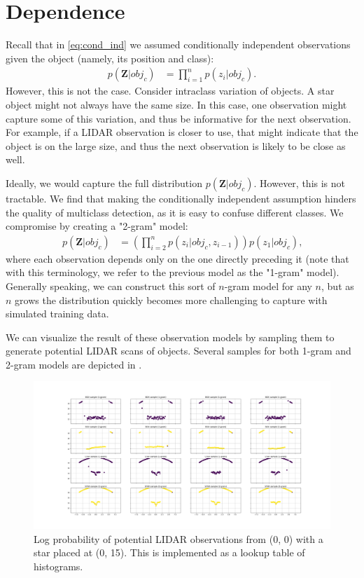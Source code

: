 \section{Dependence}

Recall that in \eqref{eq:cond_ind} we assumed conditionally independent observations
given the object (namely, its position and class):
%
\begin{align}
  p( \mathbf{Z} | obj_c ) &= \prod_{i=1}^{n} { p( z_i | obj_c) }
  \text{.}
\end{align}
%
However, this is not the case. Consider intraclass variation of objects. A star
object might not always have the same size. In this case, one observation might
capture some of this variation, and thus be informative for the next
observation. For example, if a LIDAR observation is closer to use, that might
indicate that the object is on the large size, and thus the next observation is
likely to be close as well.

Ideally, we would capture the full distribution $p ( \mathbf{Z} | obj_c )$. However,
this is not tractable. We find that making the conditionally independent
assumption hinders the quality of multiclass detection, as it is easy to confuse
different classes. We compromise by creating a "2-gram" model:
%
\begin{align}
  p( \mathbf{Z} | obj_c ) &= \left( \prod_{i=2}^{n} { p( z_i | obj_c, z_{i-1}) }
  \right) p( z_1 | obj_c)
  \text{,}
  \label{eq:2gram_model}
\end{align}
%
where each observation depends only on the one directly preceding it (note that
with this terminology, we refer to the previous model as the "1-gram" model).
Generally speaking, we can construct this sort of $n$-gram model for any $n$,
but as $n$ grows the distribution quickly becomes more challenging to capture
with simulated training data.

We can visualize the result of these observation models by sampling them to
generate potential LIDAR scans of objects. Several samples for both 1-gram and
2-gram models are depicted in .
%
\begin{figure}
  \centering
  \includegraphics[width=\textwidth]{figures/sample_models.png}
  \caption{Log probability of potential LIDAR observations from (0, 0) with a
    star placed at (0, 15). This is implemented as a lookup table of histograms.}
  \label{fig:sample_models}
\end{figure}
